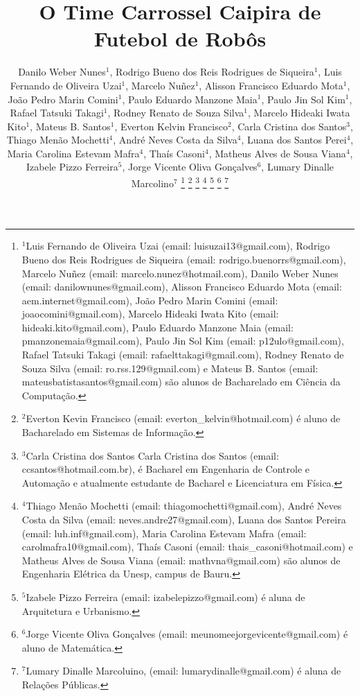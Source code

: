 \title{\LARGE \bf
O Time Carrossel Caipira de Futebol de Rob{\^o}s
}

\author{{      \centering Danilo Weber Nunes$^{1}$, Rodrigo Bueno dos Reis Rodrigues de Siqueira$^{1}$, Luis Fernando de Oliveira Uzai$^{1}$,}%
{\authorblockN \centering Marcelo Nu{\~n}ez$^{1}$, Alisson Francisco Eduardo Mota$^{1}$, João Pedro Marin Comini$^{1}$, Paulo Eduardo Manzone Maia$^{1}$,}%
{\authorblockN \centering Paulo Jin Sol Kim$^{1}$, Rafael Tatsuki Takagi$^{1}$, Rodney Renato de Souza Silva$^{1}$, Marcelo Hideaki Iwata Kito$^{1}$,}%
{\authorblockN \centering Mateus B. Santos$^{1}$, Everton Kelvin Francisco$^{2}$, Carla Cristina dos Santos$^{3}$, Thiago Men{\~a}o Mochetti$^{4}$, André}%
{\authorblockN \centering Neves Costa da Silva$^{4}$, Luana dos Santos Perei$^{4}$, Maria Carolina Estevam Mafra$^{4}$, Thaís Casoni$^{4}$, Matheus}%
{\authorblockN \centering Alves de Sousa Viana$^{4}$, Izabele Pizzo Ferreira$^{5}$, Jorge Vicente Oliva Gonçalves$^{6}$, Lumary Dinalle Marcolino$^{7}$}%
\thanks{$^{1}$Luis Fernando de Oliveira Uzai (email: luisuzai13@gmail.com),
Rodrigo Bueno dos Reis Rodrigues de Siqueira (email: rodrigo.buenorrs@gmail.com),
Marcelo Nuñez (email: marcelo.nunez@hotmail.com), Danilo Weber Nunes (email: danilownunes@gmail.com), 
Alisson Francisco Eduardo Mota (email: aem.internet@gmail.com), João Pedro Marin Comini  (email: joaocomini@gmail.com), 
Marcelo Hideaki Iwata Kito (email: hideaki.kito@gmail.com), Paulo Eduardo Manzone Maia (email: pmanzonemaia@gmail.com),
Paulo Jin Sol Kim (email: p12ulo@gmail.com), Rafael Tatsuki Takagi (email: rafaelttakagi@gmail.com),
Rodney Renato de Souza Silva (email: ro.rss.129@gmail.com) e
Mateus B. Santos (email: mateusbatistasantos@gmail.com)
são alunos de 
Bacharelado em Ciência da Computação.}
\thanks{$^{2}$Everton Kevin Francisco (email: everton\_kelvin@hotmail.com) {\'e} aluno de Bacharelado em Sistemas de Informa{\c c}{\~a}o.}
\thanks{$^{3}$Carla Cristina dos Santos Carla Cristina dos Santos (email: ccsantos@hotmail.com.br), {\'e} Bacharel em Engenharia de Controle
e Automa{\c c}{\~a}o e atualmente estudante de Bacharel e Licenciatura em F{\'i}sica.}
\thanks{$^{4}$Thiago Men{\~a}o Mochetti (email: thiagomochetti@gmail.com), André Neves Costa da Silva (email: neves.andre27@gmail.com),
Luana dos Santos Pereira (email: luh.inf@gmail.com), Maria Carolina Estevam Mafra (email: carolmafra10@gmail.com),
Thaís Casoni (email: thais\_casoni@hotmail.com) e Matheus Alves de Sousa Viana (email: mathvna@gmail.com) s{\~a}o alunos de Engenharia El{\'e}trica da Unesp, campus de Bauru.}
\thanks{$^{5}$Izabele Pizzo Ferreira (email: izabelepizzo@gmail.com) {\'e} aluna de Arquitetura e Urbanismo.}
\thanks{$^{6}$Jorge Vicente Oliva Gonçalves (email: meunomeejorgevicente@gmail.com) {\'e} aluno de Matem{\'a}tica.}
\thanks{$^{7}$Lumary Dinalle Marcoluino, (email: lumarydinalle@gmail.com) {\'e} aluna de Relações P{\'u}blicas.}
}
 
